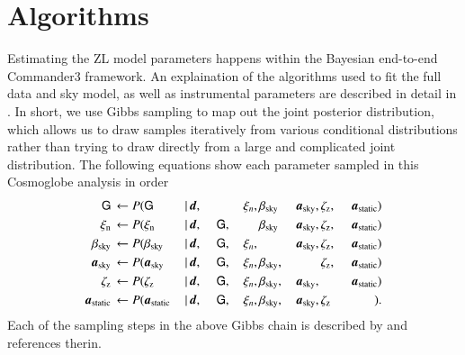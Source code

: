 \documentclass[twocolumn]{aa}
\newcommand{\dv}[0]{\vec{d}}
\renewcommand{\a}[0]{\vec{a}}
\begin{document}
\section{Algorithms}\label{sect:param-estimation}
Estimating the ZL model parameters happens within the Bayesian end-to-end Commander3 framework. An explaination of the algorithms used to fit the full data and sky model, as well as instrumental parameters are described in detail in \cite{CG02_01}. In short, we use Gibbs sampling to map out the joint posterior distribution\citep{Galloway2023}, which allows us to draw samples iteratively from various conditional distributions rather than trying to draw directly from a large and complicated joint distribution. The following equations show each parameter sampled in this Cosmoglobe analysis in order
\begin{alignat}{11}
    \tens{G} &\,\leftarrow P(\tens{G}&\,\mid &\,\dv,&\, &\,\phantom{\tens{G}} &\,\xi_n, &
    \,\beta_{\mathrm{sky}}& \,\a_{\mathrm{sky}}, &\,\zeta_{\mathrm{z}},
    &\,\a_{\mathrm{static}})\label{eq:gibbs_G}\\
    \xi_{\mathrm{n}} &\,\leftarrow P(\xi_{\mathrm{n}}&\,\mid &\,\dv,&\, &\,\tens{G}, &\,\phantom{\xi_n} &
    \,\beta_{\mathrm{sky}}& \,\a_{\mathrm{sky}}, &\,\zeta_{\mathrm{z}},
    &\,\a_{\mathrm{static}})\\
    \beta_{\mathrm{sky}} &\,\leftarrow P(\beta_{\mathrm{sky}}&\,\mid &\,\dv,&\, &\,\tens{G}, &\,\xi_n, &
    \,\phantom{\beta_{\mathrm{sky}}}& \,\a_{\mathrm{sky}}, &\,\zeta_{\mathrm{z}}, &\,\a_{\mathrm{static}})\\
    \a_{\mathrm{sky}} &\,\leftarrow P(\a_{\mathrm{sky}}&\,\mid &\,\dv,&\, &\,\tens{G}, &\,\xi_n, &
    \,\beta_{\mathrm{sky}},& \,\phantom{\a_{\mathrm{sky}},}
    &\,\zeta_{\mathrm{z}}, &\,\a_{\mathrm{static}})\\
    \zeta_{\mathrm{z}} &\,\leftarrow P(\zeta_{\mathrm{z}}&\,\mid &\,\dv,&\, &\,\tens{G}, &\,\xi_n, &
    \,\beta_{\mathrm{sky}},& \,\a_{\mathrm{sky}},
    &\,\phantom{\zeta_{\mathrm{z}},} &\,\a_{\mathrm{static}})\label{eq:gibbs_zodi}\\
    \a_{\mathrm{static}} &\,\leftarrow P(\a_{\mathrm{static}}&\,\mid &\,\dv,&\, &\,\tens{G}, &\,\xi_n, &
    \,\beta_{\mathrm{sky}},& \,\a_{\mathrm{sky}}, &\,\zeta_{\mathrm{z}} &\,\phantom{\a_{\mathrm{static}}})\label{eq:gibbs_static}.
\end{alignat}
Each of the sampling steps in the above Gibbs chain is described by \citet{CG02_01}
and references therin. 
\end{document}
